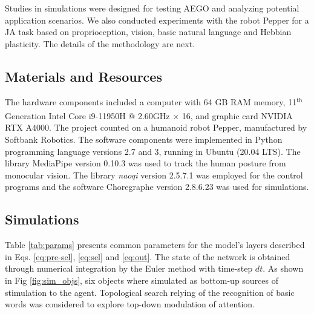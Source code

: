 \documentclass[letterpaper, 10 pt, conference]{ieeeconf}  %
\begin{document}
	Studies in simulations were designed for testing AEGO and analyzing potential application scenarios. We also conducted experiments with the robot Pepper for a JA task based on proprioception, vision, basic natural language and Hebbian plasticity. The details of the methodology are next.

	\subsection{Materials and Resources}
	
	The hardware components included a computer with 64 GB RAM memory, 11${}^\mathrm{th}$ Generation Intel\textsuperscript{\textregistered} Core\textsuperscript{\texttrademark} i9-11950H @ 2.60GHz × 16, and graphic card NVIDIA RTX A4000. The project counted on a humanoid robot Pepper, manufactured by Softbank Robotics. The software components were implemented in Python programming language versions 2.7 and 3, running in Ubuntu (20.04 LTS). The library MediaPipe version 0.10.3 was used to track the human posture from monocular vision. The library \textit{naoqi} version 2.5.7.1 was employed for the control programs and the software Choregraphe version 2.8.6.23 was used for simulations. 
	
	\subsection{Simulations}
	
	Table \ref{tab:params} presents common parameters for the model's layers described in Eqs. \eqref{eq:pre-sel}, \eqref{eq:sel} and \eqref{eq:out}. The state of the network is obtained through numerical integration by the Euler method with time-step $dt$. As shown in Fig \ref{fig:sim_objs}, six objects where simulated as bottom-up sources of stimulation to the agent. Topological search relying of the recognition of basic words was considered to explore top-down modulation of attention. %
	
	\renewcommand{\arraystretch}{1.2} %
	
\end{document}
